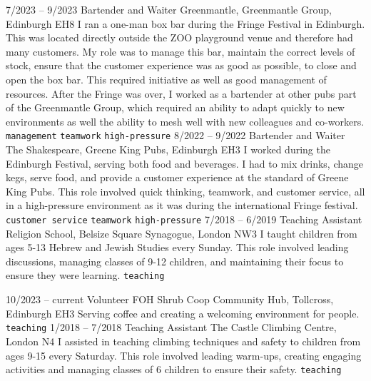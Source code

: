 \documentclass[9pt]{developercv} %
\begin{document}
\newpage
\vspace{-10 pt}
\begin{entrylist}
	\entry
        {7/2023 --  9/2023}
		{Bartender and Waiter}
		{Greenmantle, Greenmantle Group, Edinburgh EH8}
		{
			I ran a one-man box bar during the Fringe Festival in Edinburgh. 
			This was located directly outside the ZOO playground venue and therefore had many customers.
			My role was to manage this bar, maintain the correct levels of stock, ensure that the customer experience was as good as possible, to close and open the box bar.
			This required initiative as well as good management of resources.
			After the Fringe was over, I worked as a bartender at other pubs part of the Greenmantle Group, which required an ability to adapt quickly to new environments as well the ability to mesh well with new colleagues and co-workers.
        	\newline
			\texttt{management} \slashsep \texttt{teamwork} \slashsep \texttt{high-pressure}
		}
	\entry
		{8/2022 -- 9/2022}
		{Bartender and Waiter}
		{The Shakespeare, Greene King Pubs, Edinburgh EH3}
		{
			I worked during the Edinburgh Festival, serving both food and beverages.
			I had to mix drinks, change kegs, serve food, and provide a customer experience at the standard of Greene King Pubs.
			This role involved quick thinking, teamwork, and customer service, all in a high-pressure environment as it was during the international Fringe festival.
			\newline
			\texttt{customer service} \slashsep \texttt{teamwork} \slashsep \texttt{high-pressure}
		}
	\entry
		{7/2018 -- 6/2019}
		{Teaching Assistant}
		{Religion School, Belsize Square Synagogue, London NW3}
		{
			I taught children from ages 5-13 Hebrew and Jewish Studies every Sunday.
			This role involved leading discussions, managing classes of 9-12 children, and maintaining their focus to ensure they were learning.
			\newline
			\texttt{teaching}
		}
\end{entrylist}

\vspace{-10 pt}
\begin{entrylist}
	\entry
		{10/2023 -- current}
		{Volunteer FOH}
		{Shrub Coop Community Hub, Tollcross, Edinburgh EH3}
		{
			Serving coffee and creating a welcoming environment for people.
			\newline
			\texttt{teaching}
		}
	\entry
		{1/2018 -- 7/2018}
		{Teaching Assistant}
		{The Castle Climbing Centre, London N4}
		{
			I assisted in teaching climbing techniques and safety to children from ages 9-15 every Saturday.
			This role involved leading warm-ups, creating engaging activities and managing classes of 6 children to ensure their safety.
			\newline
			\texttt{teaching}
		}
\end{entrylist}
\end{document}
